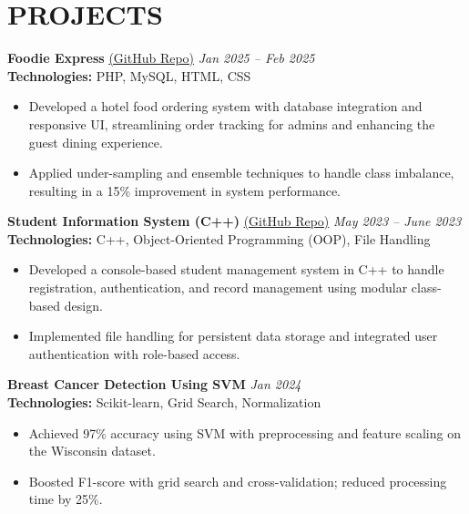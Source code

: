 \documentclass[a4paper,10pt]{article}
\begin{document}
\section*{PROJECTS}

\textbf{Foodie Express} \href{https://github.com/amoltrip28/foodie-express}{(GitHub Repo)} \hfill \textit{Jan 2025 – Feb 2025} \\
\textbf{Technologies:} PHP, MySQL, HTML, CSS 
\begin{itemize}[leftmargin=1em]
    \item Developed a hotel food ordering system with database integration and responsive UI, streamlining order tracking for admins and enhancing the guest dining experience.
    \item Applied under-sampling and ensemble techniques to handle class imbalance, resulting in a 15\% improvement in system performance.
\end{itemize}

\textbf{Student Information System (C++)} \href{https://github.com/amoltrip28/Student-Information-System}{(GitHub Repo)} \hfill \textit{May 2023 – June 2023} \\
\textbf{Technologies:} C++, Object-Oriented Programming (OOP), File Handling 
\begin{itemize}[leftmargin=1em]
    \item Developed a console-based student management system in C++ to handle registration, authentication, and record management using modular class-based design.
    \item Implemented file handling for persistent data storage and integrated user authentication with role-based access.
\end{itemize}


\textbf{Breast Cancer Detection Using SVM} \hfill \textit{Jan 2024} \\
\textbf{Technologies:} Scikit-learn, Grid Search, Normalization 
\begin{itemize}[leftmargin=1em]
    \item Achieved 97\% accuracy using SVM with preprocessing and feature scaling on the Wisconsin dataset.
    \item Boosted F1-score with grid search and cross-validation; reduced processing time by 25\%.
\end{itemize}
\end{document}
